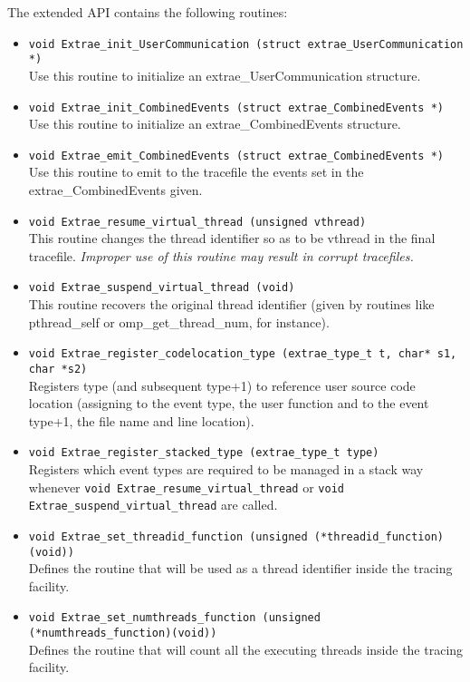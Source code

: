 The extended API contains the following routines:
\begin{itemize}

	\item {\tt void Extrae\_init\_UserCommunication (struct extrae\_UserCommunication *)}\\
	Use this routine to initialize an extrae\_UserCommunication structure.
	\item {\tt void Extrae\_init\_CombinedEvents (struct extrae\_CombinedEvents *)}\\
	Use this routine to initialize an extrae\_CombinedEvents structure.
	\item {\tt void Extrae\_emit\_CombinedEvents (struct extrae\_CombinedEvents *)}\\
	Use this routine to emit to the tracefile the events set in the extrae\_CombinedEvents given.
	\item {\tt void Extrae\_resume\_virtual\_thread (unsigned vthread)}\\
	This routine changes the thread identifier so as to be vthread in the final tracefile. {\em Improper use of this routine may result in corrupt tracefiles.}
	\item {\tt void Extrae\_suspend\_virtual\_thread (void)}\\
	This routine recovers the original thread identifier (given by routines like pthread\_self or omp\_get\_thread\_num, for instance).
	\item {\tt void Extrae\_register\_codelocation\_type (extrae\_type\_t t, char* s1, char *s2)}\\
	Registers type (and subsequent type+1) to reference user source code location (assigning to the event type, the user function and to the event type+1, the file name and line location).
	\item {\tt void Extrae\_register\_stacked\_type (extrae\_type\_t type)}\\
	Registers which event types are required to be managed in a stack way whenever {\tt void Extrae\_resume\_virtual\_thread} or {\tt void Extrae\_suspend\_virtual\_thread} are called.
	\item {\tt void Extrae\_set\_threadid\_function (unsigned (*threadid\_function)(void))}\\
	Defines the routine that will be used as a thread identifier inside the tracing facility.
	\item {\tt void Extrae\_set\_numthreads\_function (unsigned (*numthreads\_function)(void))}\\
	Defines the routine that will count all the executing threads inside the tracing facility.

\end{itemize}
